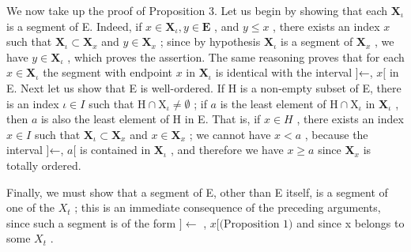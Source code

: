 We now take up the proof of Proposition 3. Let us begin by showing that each \(\mathbf{X}_{\iota}\) is a segment of E. Indeed, if \(x \in \mathbf{X}_{\iota}, y \in \mathbf{E}\) , and \(y \leqslant x\) , there exists an index \(x\) such that \(\mathbf{X}_{\iota} \subset \mathbf{X}_{x}\) and \(y \in \mathbf{X}_{x}\) ; since by hypothesis \(\mathbf{X}_{\iota}\) is a segment of \(\mathbf{X}_{x}\) , we have \(y \in \mathbf{X}_{\iota}\) , which proves the assertion. The same reasoning proves that for each \(x \in \mathbf{X}_{\iota}\) the segment with endpoint \(x\) in \(\mathbf{X}_{\iota}\) is identical with the interval {]}←, \(x[\) in E. Next let us show that E is well-ordered. If H is a non-empty subset of E, there is an index \(\iota \in I\) such that \(\mathrm{H} \cap \mathrm{X}_{\iota} \neq \emptyset\) ; if \(a\) is the least element of \(\mathrm{H} \cap \mathrm{X}_{\iota}\) in \(\mathbf{X}_{\iota}\) , then \(a\) is also the least element of H in E. That is, if \(x \in H\) , there exists an index \(x \in I\) such that \(\mathbf{X}_{\iota} \subset \mathbf{X}_{x}\) and \(x \in \mathbf{X}_{x}\) ; we cannot have \(x < a\) , because the interval {]}←, \(a[\) is contained in \(\mathbf{X}_{\iota}\) , and therefore we have \(x \geqslant a\) since \(\mathbf{X}_{x}\) is totally ordered.

Finally, we must show that a segment of E, other than E itself, is a segment of one of the \(X_{t}\) ; this is an immediate consequence of the preceding arguments, since such a segment is of the form \(]\leftarrow\) , \(x[\text{(Proposition 1)}\) and since x belongs to some \(X_{t}\) .

